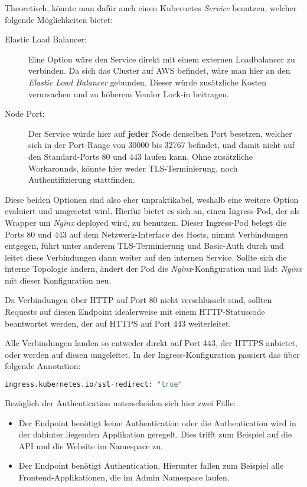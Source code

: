 Theoretisch, könnte man dafür auch einen Kubernetes \emph{Service}
benutzen, welcher folgende
Möglichkeiten bietet:

\begin{description}
  \item[Elastic Load Balancer:]
  Eine Option wäre den Service direkt mit einem externen
  Loadbalancer zu verbinden.
  Da sich das Cluster auf AWS befindet, wäre man hier an
   den \emph{Elastic Load Balancer} gebunden.
  Dieser würde zusätzliche Kosten verursachen und zu höherem
  Vendor Lock-in beitragen.
  \item[Node Port:]
  Der Service würde hier auf \textbf{jeder} Node denselben Port
  besetzen, welcher sich
  in der Port-Range von 30000 bis 32767 befindet, und damit nicht auf den
  Standard-Ports 80 und 443 laufen kann. Ohne zusätzliche Workarounds, könnte
  hier weder TLS-Terminierung, noch Authentifizierung stattfinden.
\end{description}

Diese beiden Optionen sind also eher unpraktikabel, weshalb eine weitere Option
evaluiert und umgesetzt wird.
Hierfür bietet es sich an, einen Ingress-Pod, der als Wrapper um \emph{Nginx}
deployed wird, zu benutzen.
Dieser Ingress-Pod belegt die Ports 80 und 443 auf
dem Netzwerk-Interface des Hosts,
nimmt Verbindungen entgegen, führt unter anderem
TLS-Terminierung und Basic-Auth durch und leitet diese Verbindungen dann weiter
auf den internen Service.
Sollte sich die interne Topologie ändern, ändert der Pod die
\emph{Nginx}-Konfiguration und lädt \emph{Nginx} mit dieser Konfiguration neu.

Da Verbindungen über HTTP auf Port 80 nicht verschl\"usselt sind, sollten
Requests auf diesen Endpoint idealerweise mit einem HTTP-Statuscode
beantwortet werden, der auf HTTPS auf Port 443 weiterleitet.

Alle Verbindungen landen so entweder direkt auf Port 443, der HTTPS anbietet, oder
werden auf diesen umgeleitet. In der Ingress-Konfiguration \cite{sslred}
passiert das \"uber folgende Annotation:

\begin{lstlisting}[language=Python,numbers=none]
ingress.kubernetes.io/ssl-redirect: "true"\end{lstlisting}

Bezüglich der Authentication unterscheiden sich hier zwei Fälle:
\begin{itemize}
  \item Der Endpoint benötigt keine Authentication oder die Authentication wird in
  der dahinter liegenden Applikation geregelt. Dies trifft zum Beispiel auf die API
  und die Website im  Namespace zu.
  \item Der Endpoint benötigt Authentication. Hierunter fallen zum Beispiel
  alle Frontend-Applikationen, die im Admin Namespace laufen.
\end{itemize}

